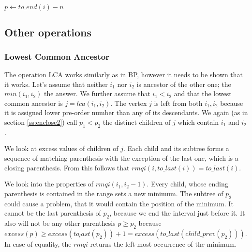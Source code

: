 \begin{algorithmic}
		\State {}
	\Else
		\State $p \gets to\_end(i) - n$
		\State {}
	\EndIf
\EndFunction
\end{algorithmic}

\subsection{Other operations}

\begin{algorithmic}
		\State {}
	\Else
		\State {}
	\EndIf
\EndFunction
\end{algorithmic}

\begin{algorithmic}
		\State {}
	\Else
		\State {}
	\EndIf
\EndFunction
\end{algorithmic}

\subsubsection{Lowest Common Ancestor}

The operation LCA works similarly as in BP, however it needs to be shown that it works.
Let's assume that neither $i_1$ nor $i_2$ is ancestor of the other one; the $min(i_1, i_2)$ the answer.
We further assume that $i_1 < i_2$ and that the lowest common ancestor is $j = lca(i_1, i_2)$.
The vertex $j$ is left from both $i_1, i_2$ because it is assigned lower pre-order number than any of its descendants.
We again (as in section \ref{ss:enclose2}) call $p_1 < p_2$ the distinct children of $j$ which contain $i_1$ and $i_2$.

We look at excess values of children of $j$.
Each child and its subtree forms a sequence of matching parenthesis with the exception of the last one, which is a closing parenthesis.
From this follows that $rmqi(i, to\_last(i)) = to\_last(i)$.

We look into the properties of $rmqi(i_1, i_2 - 1)$.
Every child, whose ending parenthesis is contained in the range sets a new minimum.
The subtree of $p_2$ could cause a problem, that it would contain the position of the minimum.
It cannot be the last parenthesis of $p_2$, because we end the interval just before it.
It also will not be any other parenthesis $p \ge p_2$ because $excess(p) \ge excess(to_last(p_2)) + 1 = excess(to\_last(child\_prev(p_2)))$.
In case of equality, the $rmqi$ returns the left-most occurrence of the minimum.

